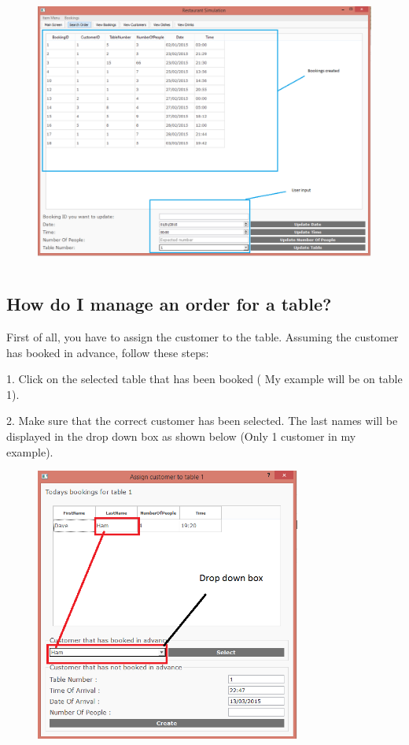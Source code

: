 \begin{figure}[H]
    \includegraphics[height = 9cm]{./Manual/images/UpdateBooking2} 
    \caption{} \label{fig:updatebooking2}
\end{figure}

\subsection{How do I manage an order for a table?}
First of all, you have to assign the customer to the table. Assuming the customer has booked in advance, follow these steps:

1. Click on the selected table that has been booked ( My example will be on table 1).

2. Make sure that the correct customer has been selected. The last names will be displayed in the drop down box as shown below (Only 1 customer in my example).
\begin{figure}[H]
    \includegraphics[height = 9cm]{./Manual/images/assignExample1} 
    \caption{} \label{fig:assignex1}
\end{figure}

